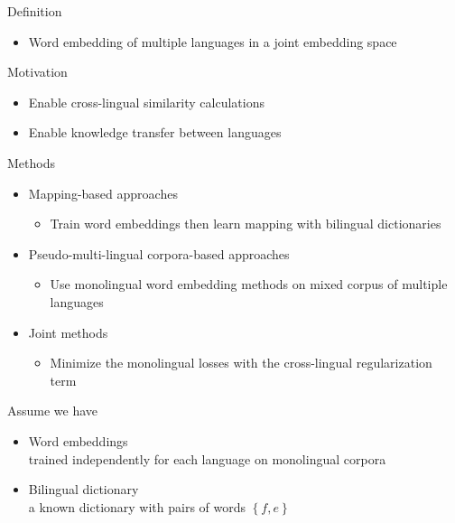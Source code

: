 \documentclass[11pt, a4paper, landscape]{article}
\begin{document}
	\NewPage
	\vfill
	Definition
	\begin{itemize}
		\item Word embedding of multiple languages in a joint embedding space		\\
	\end{itemize}
	
	Motivation
	\begin{itemize}
		\item Enable cross-lingual similarity calculations
		\item Enable knowledge transfer between languages\\
	\end{itemize}
	
	
	
	
	Methods
	\begin{itemize}
		\item Mapping-based approaches
		\begin{itemize}
			\item Train word embeddings then learn mapping with bilingual dictionaries
		\end{itemize}
		\item Pseudo-multi-lingual corpora-based approaches
		\begin{itemize}
			\item Use monolingual word embedding methods on mixed corpus of multiple languages 
		\end{itemize}
		\item Joint methods
		\begin{itemize}
			\item Minimize the monolingual losses with the cross-lingual regularization term
		\end{itemize}
	\end{itemize}
	
	\vfill
	\NewPage
	\vfill
	Assume we have
	\begin{itemize}
		\item Word embeddings \\
		trained  independently for each language on monolingual corpora
		\item Bilingual dictionary \\
		a known dictionary with pairs of words ${ \left\{ f, e \right\} }$
	\end{itemize}
	
\end{document}
